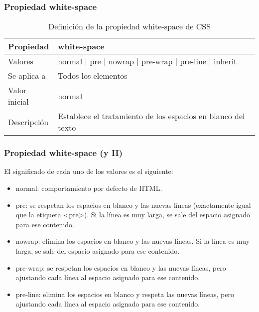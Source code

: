 \begin{frame}
\frametitle{Propiedad white-space}

\begin{center}
  \begin{table}
   \begin{tabular}{p{1.8cm}p{7.8cm}}
Propiedad & \bf{white-space} \\ \hline
Valores& normal | pre | nowrap | pre-wrap | pre-line | inherit \\ \hline
Se aplica a& Todos los elementos \\ \hline
Valor inicial& normal \\ \hline
Descripción& Establece el tratamiento de los espacios en blanco del texto \\ \hline
  \end{tabular}
   \caption{Definición de la propiedad white-space de CSS}
 \end{table}
\end{center}


\end{frame}



\begin{frame}
\frametitle{Propiedad white-space (y II)}

El significado de cada uno de los valores es el siguiente:
\begin{itemize}
  \item normal: comportamiento por defecto de HTML.
  \item pre: se respetan los espacios en blanco y las nuevas líneas (exactamente igual que la etiqueta <pre>). Si la línea es muy larga, se sale del espacio asignado para ese contenido.
  \item nowrap: elimina los espacios en blanco y las nuevas líneas. Si la línea es muy larga, se sale del espacio asignado para ese contenido.
  \item pre-wrap: se respetan los espacios en blanco y las nuevas líneas, pero ajustando cada línea al espacio asignado para ese contenido.
  \item pre-line: elimina los espacios en blanco y respeta las nuevas líneas, pero ajustando cada línea al espacio asignado para ese contenido.
\end{itemize}

\end{frame}


